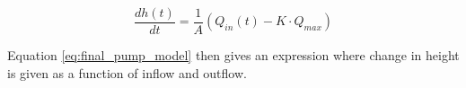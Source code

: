 \begin{equation}\label{eq:final_pump_model}
  	\frac{dh(t)}{dt}=\frac{1}{A} \left(Q_{in}(t)-K \cdot Q_{max}\right)
\end{equation}  

Equation \ref{eq:final_pump_model} then gives an expression where change in height is given as a function of inflow and outflow. 






